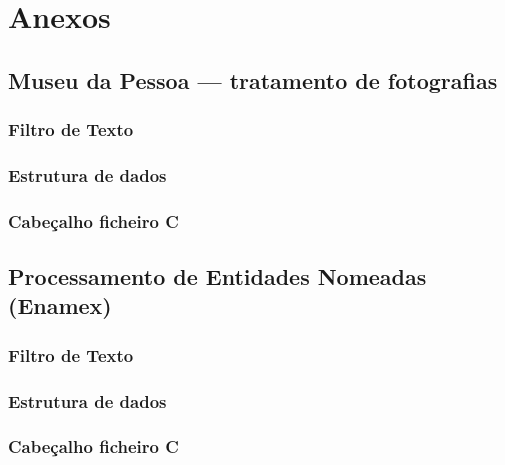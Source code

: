 \chapter{Anexos}
\label{cap:anex}


\section{Museu da Pessoa — tratamento de fotografias}
\label{seq:anex-museu}

\subsection{Filtro de Texto}
\label{seq:anex-museu-filtro}


\subsection{Estrutura de dados}
\label{seq:anex-museu-est}


\subsection{Cabeçalho ficheiro C}
\label{seq:anex-museu-header}


\section{Processamento de Entidades Nomeadas (Enamex)}
\label{seq:anex-enamex}

\subsection{Filtro de Texto}
\label{seq:anex-enamex-filtro}


\subsection{Estrutura de dados}
\label{seq:anex-enamex-est}


\subsection{Cabeçalho ficheiro C}
\label{seq:anex-enamex-header}



